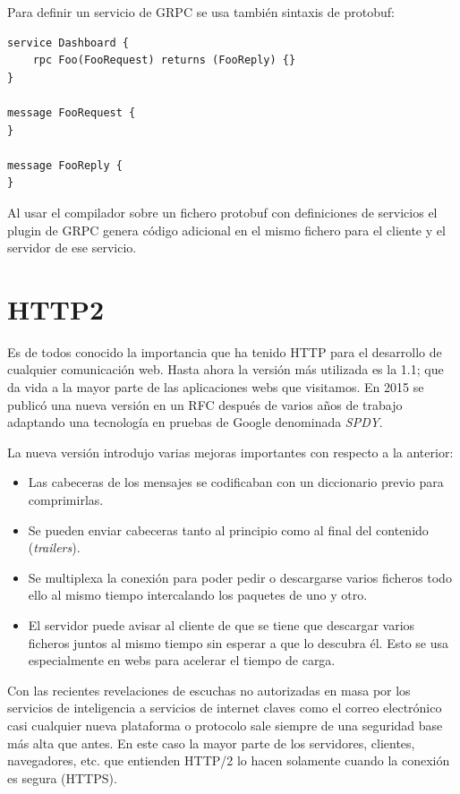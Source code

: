 Para definir un servicio de GRPC se usa también sintaxis de protobuf:
\begin{verbatim}
service Dashboard {
    rpc Foo(FooRequest) returns (FooReply) {}
}

message FooRequest {
}

message FooReply {
}
\end{verbatim}

Al usar el compilador sobre un fichero protobuf con definiciones de servicios el plugin de GRPC genera código adicional en el mismo fichero para el cliente y el servidor de ese servicio.

\section{HTTP2}
\label{sec:http2}

Es de todos conocido la importancia que ha tenido HTTP para el desarrollo de cualquier comunicación web. Hasta ahora la versión más utilizada es la 1.1; que da vida a la mayor parte de las aplicaciones webs que visitamos. En 2015 se publicó una nueva versión en un RFC\cite{rfchttp2} después de varios años de trabajo adaptando una tecnología en pruebas de Google denominada \emph{SPDY}.

La nueva versión introdujo varias mejoras importantes con respecto a la anterior:
\begin{itemize}
    \item Las cabeceras de los mensajes se codificaban con un diccionario previo para comprimirlas.
    \item Se pueden enviar cabeceras tanto al principio como al final del contenido (\emph{trailers}).
    \item Se multiplexa la conexión para poder pedir o descargarse varios ficheros todo ello al mismo tiempo intercalando los paquetes de uno y otro.
    \item El servidor puede avisar al cliente de que se tiene que descargar varios ficheros juntos al mismo tiempo sin esperar a que lo descubra él. Esto se usa especialmente en webs para acelerar el tiempo de carga.
\end{itemize}

Con las recientes revelaciones de escuchas no autorizadas en masa por los servicios de inteligencia a servicios de internet claves como el correo electrónico casi cualquier nueva plataforma o protocolo sale siempre de una seguridad base más alta que antes. En este caso la mayor parte de los servidores, clientes, navegadores, etc. que entienden HTTP/2 lo hacen solamente cuando la conexión es segura (HTTPS).

